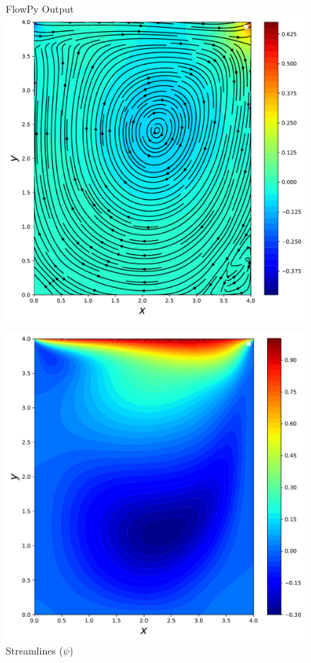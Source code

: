 \documentclass{article}
\begin{document}
\begin{figure}[htb!]
	\centering \large{FlowPy Output} \\
	\includegraphics[width=\linewidth]{./images/Re400FlowPy_pres_stream}
	\caption{Streamlines ($\psi$)}
	\label{fig:pres_example1}
	\endminipage\hfill
	\includegraphics[width=\linewidth]{./images/Re400FlowPy_u}

\end{figure}
\end{document}
